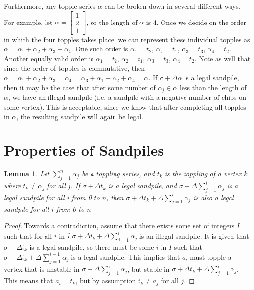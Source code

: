 \documentclass[12pt]{article}
\newtheorem{lemma}{Lemma}
\begin{document}
Furthermore, any topple series $\alpha$ can be broken down in several different ways.  For example, let $\alpha = \begin{bmatrix} 1 \\ 2 \\ 1 \end{bmatrix}$, so the length of $\alpha$ is 4.  Once we decide on the order in which the four topples takes place, we can represent these individual topples as $\alpha = \alpha_1 + \alpha_2 + \alpha_3 + \alpha_4$.  One such order is $\alpha_1 = t_2$, $\alpha_2 = t_1$, $\alpha_3 = t_3$, $\alpha_4 = t_2$.  Another equally valid order is $\alpha_1 = t_2$, $\alpha_2 = t_1$, $\alpha_3 = t_3$, $\alpha_4 = t_2$.  Note as well that since the order of topples is commutative, then $\alpha = \alpha_1 + \alpha_2 + \alpha_3 = \alpha_4 = \alpha_3 + \alpha_1 + \alpha_2 + \alpha_4 = \alpha$.  If $\sigma + \Delta \alpha$ is a legal sandpile, then it may be the case that after some number of $\alpha_j \in \alpha$ less than the length of $\alpha$, we have an illegal sandpile (i.e. a sandpile with a negative number of chips on some vertex).  This is acceptable, since we know that after completing all topples in $\alpha$, the resulting sandpile will again be legal.


\section{Properties of Sandpiles}

\begin{lemma}\label{Evan's Helpful Lemma}
Let $\sum_{j = 1}^n \alpha_j$ be a toppling series, and $t_k$ is the toppling of a vertex $k$ where $t_k \neq \alpha_j$ for all $j$.  If $\sigma + \Delta t_k$ is a legal sandpile, and $\sigma + \Delta \sum_{j = 1}^i \alpha_j$ is a legal sandpile for all $i$ from 0 to $n$, then $\sigma + \Delta t_k + \Delta \sum_{j = 1}^i \alpha_j$ is also a legal sandpile for all $i$ from 0 to $n$.
\end{lemma}
\begin{proof}
Towards a contradiction, assume that there exists some set of integers $I$ such that for all $i$ in $I$ $\sigma + \Delta t_k + \Delta \sum_{j = 1}^i \alpha_j$ is an illegal sandpile.  It is given that $\sigma + \Delta t_k$ is a legal sandpile, so there must be some $i$ in $I$ such that $\sigma + \Delta t_k + \Delta \sum_{j = 1}^{i-1} \alpha_j$ is a legal sandpile.  This implies that $a_i$ must topple a vertex that is unstable in $\sigma + \Delta \sum_{j = 1}^i \alpha_j$, but stable in $\sigma + \Delta t_k + \Delta \sum_{j = 1}^i \alpha_j$.  This means that $a_i=t_k$, but by assumption $t_k \neq a_j$ for all $j$.
\end{proof}
\end{document}
